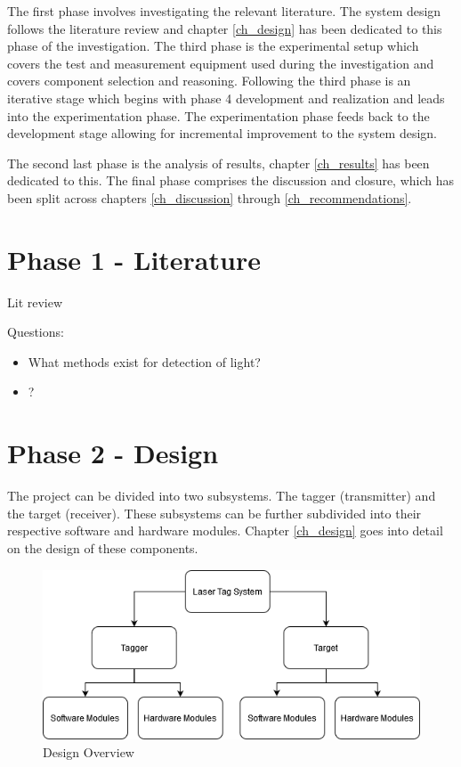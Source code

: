 The first phase involves investigating the relevant literature. The system design follows the literature review and chapter \ref{ch_design} has been dedicated to this phase of the investigation. The third phase is the experimental setup which covers the test and measurement equipment used during the investigation and covers component selection and reasoning. Following the third phase is an iterative stage which begins with phase 4 development and realization and leads into the experimentation phase. The experimentation phase feeds back to the development stage allowing for incremental improvement to the system design.

The second last phase is the analysis of results, chapter \ref{ch_results} has been dedicated to this. The final phase comprises the discussion and closure, which has been split across chapters \ref{ch_discussion} through \ref{ch_recommendations}.

\section{Phase 1 - Literature}

Lit review

Questions:

\begin{itemize}
	\item What methods exist for detection of light?
	\item ?
\end{itemize}



\section{Phase 2 - Design}

The project can be divided into two subsystems. The tagger (transmitter) and the target (receiver). These subsystems can be further subdivided into their respective software and hardware modules. Chapter \ref{ch_design} goes into detail on the design of these components.

\begin{figure}[H]
	\centering
	\includegraphics[width=0.7\linewidth]{figures/methodology/design_overview}
	\caption{Design Overview}
	\label{fig:designoverview}
\end{figure}

